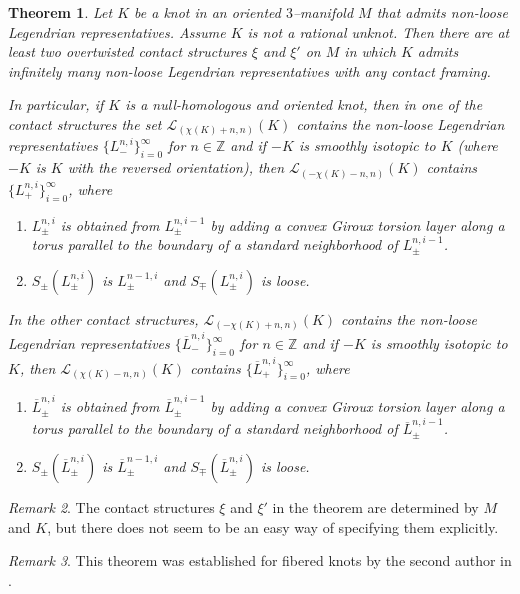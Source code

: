 \documentclass[11pt]{amsart}
\theoremstyle{plain}
\newtheorem{theorem}{Theorem}
\theoremstyle{definition}
\theoremstyle{remark}
\newtheorem{remark}[theorem]{Remark}
\numberwithin{theorem}{section}
\begin{document}
\begin{theorem}\label{allhaveinfinity}
Let $K$ be a knot in an oriented $3$--manifold $M$ that admits non-loose  Legendrian representatives. Assume $K$ is not a rational unknot. Then there are at least two overtwisted contact structures $\xi$ and $\xi'$ on $M$ in which $K$ admits infinitely many non-loose Legendrian representatives with any contact framing. 

In particular, if $K$ is a null-homologous and oriented knot, then in one of the contact structures the set $\mathcal{L}_{(\chi(K)+n,n)} (K)$ contains the non-loose Legendrian representatives $\{L_-^{n,i}\}_{i=0}^\infty$ for $n \in \mathbb{Z}$ and if $-K$ is smoothly isotopic to $K$ (where $-K$ is $K$ with the reversed orientation), then $\mathcal{L}_{(-\chi(K)-n,n)} (K)$ contains $\{L_+^{n,i}\}_{i=0}^\infty$, where 

\begin{enumerate}
  \item $L_\pm^{n,i}$ is obtained from $L_\pm^{n,i-1}$ by adding a convex Giroux torsion layer along a torus parallel to the boundary of a standard neighborhood of $L^{n,i-1}_\pm$.
  \item  $S_{\pm}(L_\pm^{n,i})$ is $L_\pm^{n-1,i}$ and $S_\mp(L_\pm^{n,i})$ is loose. 
\end{enumerate}

In the other contact structures, $\mathcal{L}_{(-\chi(K)+n,n)} (K)$ contains the non-loose Legendrian representatives $\{\overline L_-^{n,i}\}_{i=0}^\infty$ for $n \in \mathbb{Z}$ and if $-K$ is smoothly isotopic to $K$, then $\mathcal{L}_{(\chi(K)-n,n)}(K)$ contains $\{\overline L_+^{n,i}\}_{i=0}^\infty$, where 
\begin{enumerate}
\item $\overline L_\pm^{n,i}$  is obtained from $\overline L_\pm^{n,i-1}$ by adding a convex Giroux torsion layer along a torus parallel to the boundary of a standard neighborhood of $\overline L^{n,i-1}_\pm$.
\item $S_\pm(\overline L_\pm^{n,i})$ is $\overline L_\pm^{n-1,i}$  and $S_\mp(\overline L_\pm^{n,i})$ is loose. 
\end{enumerate}
\end{theorem}
\begin{remark}
The contact structures $\xi$ and $\xi'$ in the theorem are determined by $M$ and $K$, but there does not seem to be an easy way of specifying them explicitly.
\end{remark}
\begin{remark}
This theorem was established for fibered knots by the second author in \cite{Etnyre13}.
\end{remark}
\end{document}
